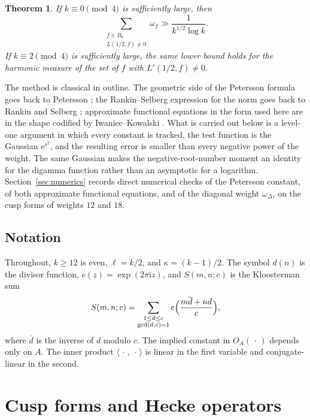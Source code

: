 \documentclass[11pt]{amsart}
\newtheorem{theorem}{Theorem}[section]
\theoremstyle{definition}
\theoremstyle{remark}
\numberwithin{equation}{section}
\newcommand{\ee}{\mathrm{e}}
\newcommand{\ii}{\mathrm{i}}
\begin{document}
\begin{theorem}\label{thm:nonvan}
If $k\equiv 0\pmod 4$ is sufficiently large, then
\[
\sum_{\substack{f\in B_k\\ L(1/2,f)\ne 0}}\omega_f
\gg\frac{1}{k^{1/2}\log k}.
\]
If $k\equiv 2\pmod 4$ is sufficiently large, the same lower bound holds for the harmonic measure of the set of $f$ with $L'(1/2,f)\ne 0$.
\end{theorem}

The method is classical in outline. The geometric side of the Petersson formula goes back to Petersson \cite{Petersson1932}; the Rankin--Selberg expression for the norm goes back to Rankin and Selberg \cite{Rankin1939,Selberg1940}; approximate functional equations in the form used here are in the shape codified by Iwaniec--Kowalski \cite{IK2004}. What is carried out below is a level-one argument in which every constant is tracked, the test function is the Gaussian $\ee^{s^2}$, and the resulting error is smaller than every negative power of the weight. The same Gaussian makes the negative-root-number moment an identity for the digamma function rather than an asymptotic for a logarithm. Section~\ref{sec:numerics} records direct numerical checks of the Petersson constant, of both approximate functional equations, and of the diagonal weight $\omega_\Delta$, on the cusp forms of weights $12$ and $18$.

\subsection*{Notation}
Throughout, $k\ge 12$ is even, $\ell=k/2$, and $\kappa=(k-1)/2$. The symbol $d(n)$ is the divisor function, $e(z)=\exp(2\pi\ii z)$, and $S(m,n;c)$ is the Kloosterman sum
\[
S(m,n;c)=\sum_{\substack{1\le d\le c\\ \gcd(d,c)=1}}
e\Bigl(\frac{m\overline d+nd}{c}\Bigr),
\]
where $\overline d$ is the inverse of $d$ modulo $c$. The implied constant in $O_A(\,\cdot\,)$ depends only on $A$. The inner product $\langle\,\cdot\,,\,\cdot\,\rangle$ is linear in the first variable and conjugate-linear in the second.

\section{Cusp forms and Hecke operators}
\label{sec:forms}
\end{document}
